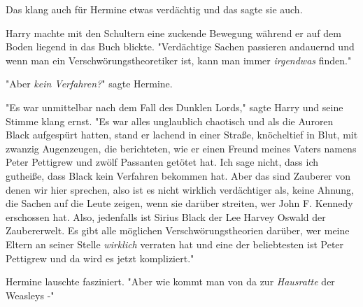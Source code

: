 {Das klang auch für Hermine etwas verdächtig und das sagte sie auch.

Harry machte mit den Schultern eine zuckende Bewegung während er auf dem Boden liegend in das Buch blickte. "Verdächtige Sachen passieren andauernd und wenn man ein Verschwörungstheoretiker ist, kann man immer \emph{irgendwas} finden."

"Aber \emph{kein Verfahren?}" sagte Hermine.

"Es war unmittelbar nach dem Fall des Dunklen Lords," sagte Harry und seine Stimme klang ernst. "Es war alles unglaublich chaotisch und als die Auroren Black aufgespürt hatten, stand er lachend in einer Straße, knöcheltief in Blut, mit zwanzig Augenzeugen, die berichteten, wie er einen Freund meines Vaters namens Peter Pettigrew und zwölf Passanten getötet hat. Ich sage nicht, dass ich gutheiße, dass Black kein Verfahren bekommen hat. Aber das sind Zauberer von denen wir hier sprechen, also ist es nicht wirklich verdächtiger als, keine Ahnung, die Sachen auf die Leute zeigen, wenn sie darüber streiten, wer John F. Kennedy erschossen hat. Also, jedenfalls ist Sirius Black der Lee Harvey Oswald der Zaubererwelt. Es gibt alle möglichen Verschwörungstheorien darüber, wer meine Eltern an seiner Stelle \emph{wirklich} verraten hat und eine der beliebtesten ist Peter Pettigrew und da wird es jetzt kompliziert."

Hermine lauschte fasziniert. "Aber wie kommt man von da zur \emph{Hausratte} der Weasleys -"

}

